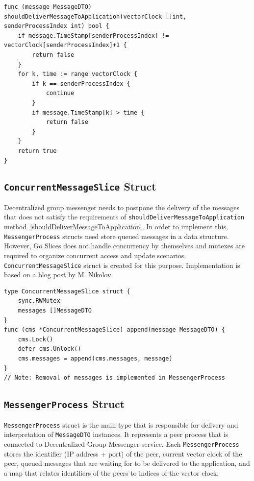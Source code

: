 \documentclass[a4paper]{article}
\begin{document}
\begin{lstlisting}[caption={\texttt{shouldDeliverMessageToApplication} Implementation}, label=shouldDeliverMessageToApplication]
func (message MessageDTO) shouldDeliverMessageToApplication(vectorClock []int, senderProcessIndex int) bool {
    if message.TimeStamp[senderProcessIndex] != vectorClock[senderProcessIndex]+1 {
        return false
    }
    for k, time := range vectorClock {
        if k == senderProcessIndex {
            continue
        }
        if message.TimeStamp[k] > time {
            return false
        }
    }
    return true
}
\end{lstlisting}

\subsection{\texttt{ConcurrentMessageSlice} Struct}
Decentralized group messenger needs to postpone the delivery of the messages that does not satisfy the requirements of \texttt{shouldDeliverMessageToApplication} method~\ref{shouldDeliverMessageToApplication}. In order to implement this, \texttt{MessengerProcess} structs need store queued messages in a data structure. However, Go Slices does not handle concurrency by themselves and mutexes are required to organize concurrent access and update scenarios. \texttt{ConcurrentMessageSlice} struct is created for this purpose. Implementation is based on a blog post by M. Nikolov. \cite{concurrentmapblog}

\begin{lstlisting}[caption={\texttt{ConcurrentMessageSlice} Struct}]
type ConcurrentMessageSlice struct {
    sync.RWMutex
    messages []MessageDTO
}
func (cms *ConcurrentMessageSlice) append(message MessageDTO) {
    cms.Lock()
    defer cms.Unlock()
    cms.messages = append(cms.messages, message)
}
// Note: Removal of messages is implemented in MessengerProcess
\end{lstlisting}

\subsection{\texttt{MessengerProcess} Struct}

\texttt{MessengerProcess} struct is the main type that is responsible for delivery and interpretation of \texttt{MessageDTO} instances. It represents a peer process that is connected to Decentralized Group Messenger service. Each \texttt{MessengerProcess} stores the identifier (IP address + port) of the peer, current vector clock of the peer, queued messages that are waiting for to be delivered to the application, and a map that relates identifiers of the peers to indices of the vector clock.
\end{document}
